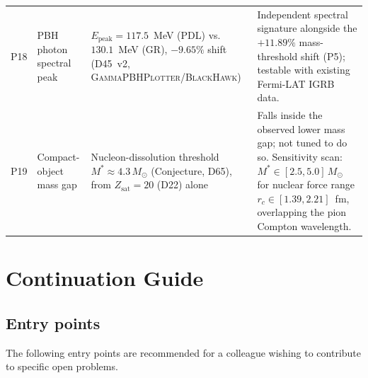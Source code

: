 \documentclass[11pt,a4paper]{article}
\theoremstyle{plain}
\theoremstyle{definition}
\theoremstyle{remark}
\newcommand{\Zsat}{Z_{\mathrm{sat}}}
\begin{document}
\begin{longtable}{L{0.5cm}L{3.2cm}L{5.2cm}L{4.2cm}}
P18 & PBH photon spectral peak & $E_{\mathrm{peak}}=117.5$~MeV (PDL) vs.\ $130.1$~MeV (GR), $-9.65\%$ shift (D45~v2, \textsc{GammaPBHPlotter}/\textsc{BlackHawk}) & Independent spectral signature alongside the $+11.89\%$ mass-threshold shift (P5); testable with existing Fermi-LAT IGRB data.\\[0.4em]
P19 & Compact-object mass gap & Nucleon-dissolution threshold $M^*\approx4.3\,M_\odot$ (Conjecture, D65), from $\Zsat=20$ (D22) alone & Falls inside the observed lower mass gap; not tuned to do so. Sensitivity scan: $M^*\in[2.5,5.0]\,M_\odot$ for nuclear force range $r_c\in[1.39,2.21]$~fm, overlapping the pion Compton wavelength.\\[0.4em]
\end{longtable}

\section{Continuation Guide}
\label{sec:continuation}

\subsection{Entry points}
\label{subsec:entrypoints}
The following entry points are recommended for a colleague wishing to contribute to specific open problems.
\end{document}
